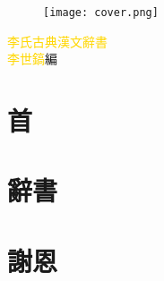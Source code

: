 \documentclass[a5paper,11pt]{report}
\begin{document}
\begin{titlepage}
\doublespacing
\begin{wrapfigure}{r}{50mm}
\texttt{[image: cover.png]}
\end{wrapfigure}
\hfill
\vfill
{
{\huge\textcolor{gold}{李氏古典漢文辭書}}\\
{\textcolor{gold}{李世鎬}\hspace{14pt}編}
}
\vspace{64pt}
\end{titlepage}
\begin{verticaltypesetting}
\addtolength{\topmargin}{20mm}
\addtolength{\bottom}{-20mm}
\newpage
\chapter*{首}
\doublespacing


\chapter*{辭書}
\begin{multicols}{2}
\begin{flushleft}
\onehalfspacing

\end{flushleft}
\end{multicols}

\chapter*{謝恩}
\doublespacing

\end{verticaltypesetting}
\end{document}
